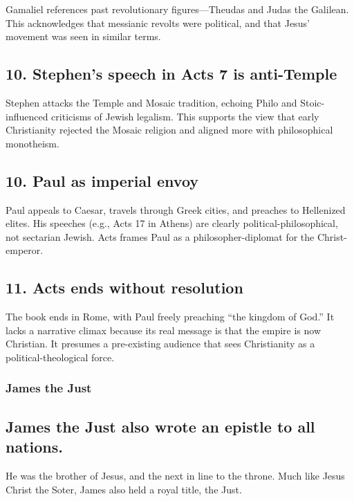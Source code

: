Gamaliel references past revolutionary figures---Theudas and Judas the Galilean.
This acknowledges that messianic revolts were political, and that Jesus' movement was seen in similar terms.

\subsection{10.
Stephen's speech in Acts 7 is anti-Temple}\label{subsec:stephens-speech-in-acts-7-is-anti-temple}

Stephen attacks the Temple and Mosaic tradition, echoing Philo and Stoic-influenced criticisms of Jewish legalism.
This supports the view that early Christianity rejected the Mosaic religion and aligned more with philosophical monotheism.

\subsection{10.
Paul as imperial envoy}\label{subsec:paul-as-imperial-envoy}

Paul appeals to Caesar, travels through Greek cities, and preaches to Hellenized elites.
His speeches (e.g., Acts 17 in Athens) are clearly political-philosophical, not sectarian Jewish.
Acts frames Paul as a philosopher-diplomat for the Christ-emperor.

\subsection{11.
Acts ends without resolution}\label{subsec:acts-ends-without-resolution}

The book ends in Rome, with Paul freely preaching ``the kingdom of God.''
It lacks a narrative climax because its real message is that the empire is now Christian.
It presumes a pre-existing audience that sees Christianity as a political-theological force.

\subsubsection{James the Just}\label{subsec:james-the-just}

\subsection{James the Just also wrote an epistle to all nations.}\label{subsec:james-the-just-also-wrote-an-epistle-to-all-nations.}

He was the brother of Jesus, and the next in line to the throne.
Much like Jesus Christ the Soter, James also held a royal title, the Just.


